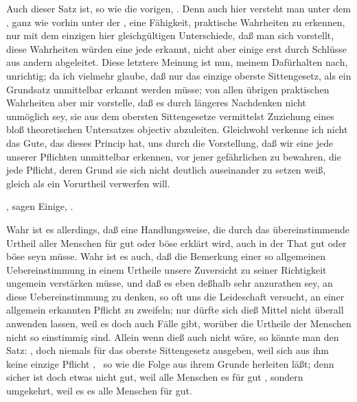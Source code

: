 Auch dieser Satz ist, so wie die vorigen, . Denn auch hier versteht man unter dem , ganz wie vorhin unter der , eine Fähigkeit, praktische Wahrheiten zu erkennen, nur mit dem einzigen hier gleichgültigen Unterschiede, daß man sich vorstellt, diese Wahrheiten würden eine jede  erkannt, nicht aber einige erst durch Schlüsse aus andern abgeleitet. Diese letztere Meinung ist nun, meinem Dafürhalten nach, unrichtig; da ich vielmehr glaube, daß nur das einzige oberste Sittengesetz, als ein Grundsatz unmittelbar erkannt werden müsse; von allen übrigen praktischen Wahrheiten aber mir vorstelle, daß es durch längeres Nachdenken nicht unmöglich sey, sie aus dem obersten Sittengesetze vermittelst Zuziehung eines bloß theoretischen Untersatzes objectiv abzuleiten. Gleichwohl verkenne ich nicht das Gute, das dieses Princip hat, uns durch die Vorstellung, daß wir eine jede unserer Pflichten unmittelbar erkennen, vor jener gefährlichen  zu bewahren, die jede Pflicht, deren Grund sie sich nicht deutlich auseinander zu setzen weiß, gleich als ein Vorurtheil verwerfen will.
\begin{aufza}\setcounter{enumi}{5}
\item {}, sagen Einige, .
\end{aufza}\par
Wahr ist es allerdings, daß eine Handlungsweise, die durch das übereinstimmende Urtheil aller Menschen für gut oder böse erklärt wird, auch in der That gut oder böse seyn müsse. Wahr ist es auch, daß die Bemerkung einer so allgemeinen Uebereinstimmung in einem Urtheile unsere Zuversicht zu seiner Richtigkeit ungemein verstärken müsse, und daß es eben deßhalb sehr anzurathen sey, an diese Uebereinstimmung zu denken, so oft uns die Leideschaft versucht, an einer allgemein erkannten Pflicht zu zweifeln; nur dürfte sich dieß Mittel nicht überall anwenden lassen, weil es doch auch Fälle gibt, worüber die Urtheile der Menschen nicht so einstimmig sind. Allein wenn dieß auch nicht wäre, so könnte man den Satz: , doch niemals für das oberste Sittengesetz ausgeben, weil sich aus ihm keine einzige Pflicht , \dh\ so wie die Folge aus ihrem Grunde herleiten läßt; denn sicher ist doch etwas nicht  gut, weil alle Menschen es für gut , sondern umgekehrt, weil es  es alle Menschen für gut.~
